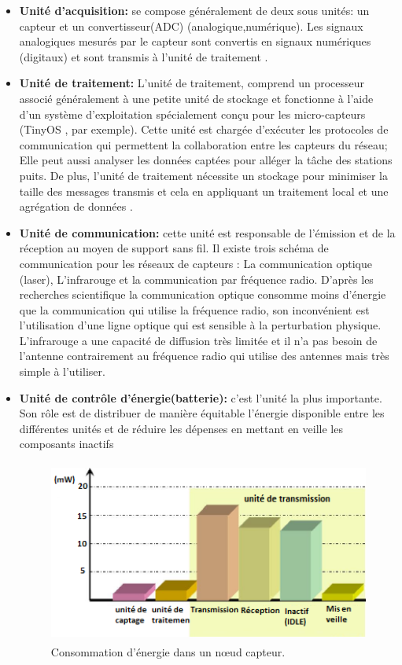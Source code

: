 \begin{itemize}
  \item \textbf{Unité d’acquisition: }se compose généralement de deux sous unités: un capteur et un convertisseur(ADC) (analogique,numérique).
Les signaux analogiques mesurés par le capteur sont convertis en signaux numériques (digitaux) et sont transmis à l’unité de traitement \cite{mekidicheetude}.
 
  \item \textbf{Unité de traitement: }L’unité de traitement, comprend un processeur associé généralement à une petite unité de stockage et fonctionne à l’aide d’un système d’exploitation spécialement conçu pour les micro-capteurs (TinyOS \cite{hill2000system}, par exemple). Cette unité est chargée d’exécuter les protocoles de communication qui permettent la collaboration entre les capteurs du réseau; Elle peut aussi analyser les données captées pour alléger la tâche des stations puits. De plus, l’unité de traitement nécessite un stockage pour minimiser la taille des messages transmis et cela en appliquant un traitement local et une agrégation de données \cite{feng2002system}.
	\item \textbf{Unité de communication: }cette unité est responsable de l’émission et de la réception au moyen de support sans fil. Il existe trois schéma de communication pour les réseaux de capteurs : La communication optique (laser), L’infrarouge et la communication par fréquence radio. D’après les recherches scientifique la communication optique consomme moins d’énergie que la communication qui utilise la fréquence radio, son inconvénient est l’utilisation  d’une ligne optique qui est sensible à la perturbation physique. L’infrarouge a une capacité de diffusion très limitée et il n’a pas besoin de l’antenne contrairement au fréquence radio qui utilise des antennes mais très simple à l’utiliser.
	\item \textbf{Unité de contrôle d’énergie(batterie): }c’est l’unité la plus importante. Son rôle est de distribuer de manière équitable l'énergie disponible entre les différentes unités et de réduire les dépenses en mettant en veille les composants inactifs
\begin{figure}[H]
	\centering
	\includegraphics[width=14cm,height=6cm]{Chap1/4.png}
	\caption{Consommation d’énergie dans un nœud capteur. \cite{raghunathan2005design,karl2007protocols}}
	\label{fig:CENC}
\end{figure}
\end{itemize}

